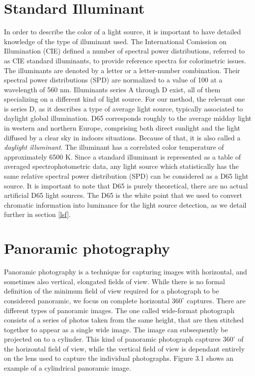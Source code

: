 \section{Standard Illuminant}
In order to describe the color of a light source, it is important to have detailed knowledge of the type of illuminant used. The International Comission on Illumination (CIE) defined a number of spectral power distributions, referred to as CIE standard illuminants, to provide reference spectra for colorimetric issues. The illuminants are denoted by a letter or a letter-number combination. Their spectral power distributions (SPD) are normalized to a value of 100 at a wavelength of 560 nm. Illuminants series A through D exist, all of them specializing on a different kind of light source. For our method, the relevant one is series D, as it describes a type of average light source, typically associated to daylight global illumination.\newline
D65 corresponds roughly to the average midday light in western and northern Europe, comprising both direct sunlight and the light diffused by a clear sky in indoors situations. Because of that, it is also called a \emph{daylight illuminant}. The illuminant has a correlated color temperature of approximately 6500 K. Since a standard illuminant is represented as a table of averaged spectrophotometric data, any light source which statistically has the same relative spectral power distribution (SPD) can be considered as a D65 light source. It is important to note that D65 is purely theoretical, there are no actual artificial D65 light sources. The D65 is the white point that we used to convert chromatic information into luminance for the light source detection, as we detail further in section \ref{lsf}.

\section{Panoramic photography}
Panoramic photography is a technique for capturing images with horizontal, and sometimes also vertical, elongated fields of view. While there is no formal definition of the minimum field of view required for a photograph to be considered panoramic, we focus on complete horizontal $360^{\circ}$ captures.\newline
There are different types of panoramic images. The one called wide-format photograph consists of a series of photos taken from the same height, that are then stitched together to appear as a single wide image. The image can subsequently be projected on to a cylinder. This kind of panoramic photograph captures $360^{\circ}$ of the horizontal field of view, while the vertical field of view is dependant entirely on the lens used to capture the individual photographs. Figure 3.1 shows an example of a cylindrical panoramic image. 

